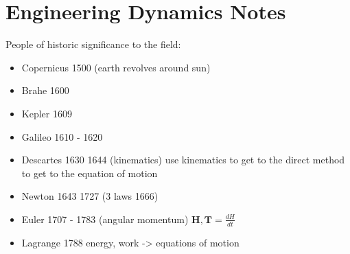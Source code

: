 \section{Engineering Dynamics Notes}

People of historic significance to the field:
\begin{itemize}
\item Copernicus 1500 (earth revolves around sun)
\item Brahe 1600
\item Kepler 1609
\item Galileo 1610 - 1620
\item Descartes 1630 1644 (kinematics) use kinematics to get to the direct method to get to the equation of motion
\item Newton 1643 1727 (3 laws 1666)
\item Euler 1707 - 1783 (angular momentum) $\mathbf H, \mathbf T = \frac{dH}{dt}$
\item Lagrange 1788 energy, work -> equations of motion
\end{itemize}

